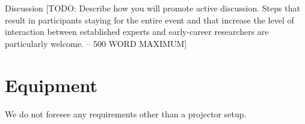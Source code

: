 \documentclass{amsart}
\theoremstyle{definition}
\begin{document}
Discussion
[TODO: Describe how you will promote active discussion. Steps that result in participants staying for the entire
event and that increase the level of interaction between established experts and early-career researchers 
are particularly welcome. -- 500 WORD MAXIMUM]

\section{Equipment}
We do not foresee any requirements other than a projector setup.




\end{document}
